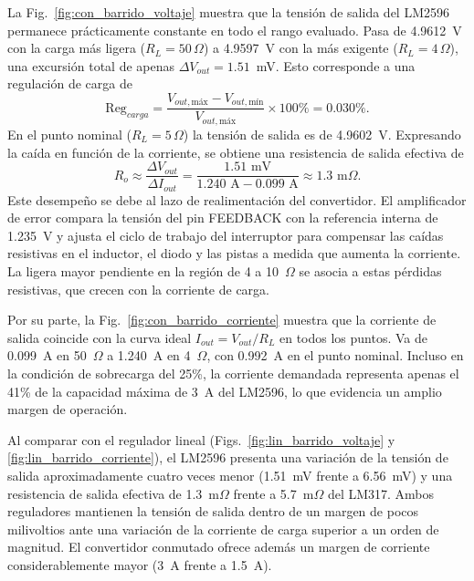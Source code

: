 \documentclass[conference]{IEEEtran}
\begin{document}
La Fig.~\ref{fig:con_barrido_voltaje} muestra que la tensión de salida del LM2596 permanece prácticamente constante en todo el rango evaluado. Pasa de 4.9612~V con la carga más ligera ($R_L = 50\,\Omega$) a 4.9597~V con la más exigente ($R_L = 4\,\Omega$), una excursión total de apenas $\Delta V_{out} = 1.51$~mV. Esto corresponde a una regulación de carga de
\begin{equation}
\text{Reg}_{carga} = \frac{V_{out,\text{máx}} - V_{out,\text{mín}}}{V_{out,\text{máx}}} \times 100\% = 0.030\%.
\end{equation}
En el punto nominal ($R_L = 5\,\Omega$) la tensión de salida es de 4.9602~V. Expresando la caída en función de la corriente, se obtiene una resistencia de salida efectiva de
\begin{equation}
R_{o} \approx \frac{\Delta V_{out}}{\Delta I_{out}} = \frac{1.51\text{ mV}}{1.240\text{ A} - 0.099\text{ A}} \approx 1.3\text{ m}\Omega.
\end{equation}
Este desempeño se debe al lazo de realimentación del convertidor. El amplificador de error compara la tensión del pin FEEDBACK con la referencia interna de 1.235~V y ajusta el ciclo de trabajo del interruptor para compensar las caídas resistivas en el inductor, el diodo y las pistas a medida que aumenta la corriente. La ligera mayor pendiente en la región de 4 a 10~$\Omega$ se asocia a estas pérdidas resistivas, que crecen con la corriente de carga.

Por su parte, la Fig.~\ref{fig:con_barrido_corriente} muestra que la corriente de salida coincide con la curva ideal $I_{out} = V_{out}/R_L$ en todos los puntos. Va de 0.099~A en 50~$\Omega$ a 1.240~A en 4~$\Omega$, con 0.992~A en el punto nominal. Incluso en la condición de sobrecarga del 25\%, la corriente demandada representa apenas el 41\% de la capacidad máxima de 3~A del LM2596, lo que evidencia un amplio margen de operación.

Al comparar con el regulador lineal (Figs.~\ref{fig:lin_barrido_voltaje} y \ref{fig:lin_barrido_corriente}), el LM2596 presenta una variación de la tensión de salida aproximadamente cuatro veces menor (1.51~mV frente a 6.56~mV) y una resistencia de salida efectiva de 1.3~m$\Omega$ frente a 5.7~m$\Omega$ del LM317. Ambos reguladores mantienen la tensión de salida dentro de un margen de pocos milivoltios ante una variación de la corriente de carga superior a un orden de magnitud. El convertidor conmutado ofrece además un margen de corriente considerablemente mayor (3~A frente a 1.5~A).
\end{document}
